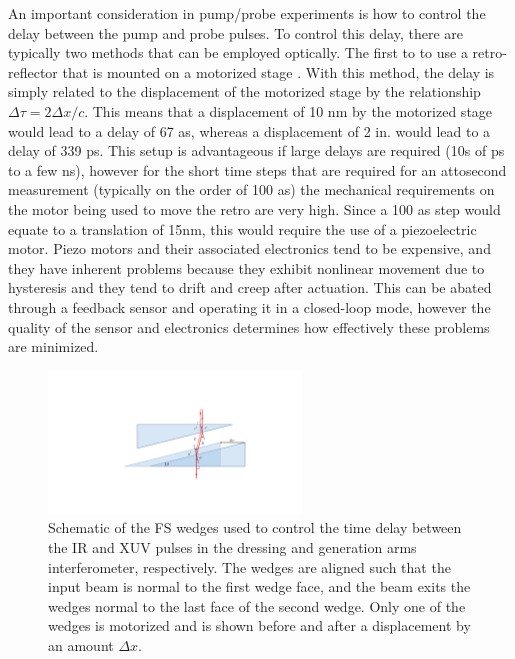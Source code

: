 An important consideration in pump/probe experiments is how to control the delay between the pump and probe pulses.  To control this delay, there are typically two methods that can be employed optically.  The first to to use a retro-reflector that is mounted on a motorized stage \cite{jagerAttosecondTransientAbsorption2018, jagerAttosecondTransientAbsorption2017, bellTransientAbsorptionSpectroscopy2013, jiangChargeCarrierDynamics2015, borjaElectronDynamicsSolids2016, chengAttoseondTransientAbsorption2015}.  With this method, the delay is simply related to the displacement of the motorized stage by the relationship $\Delta\tau = 2\Delta x/c$.  This means that a displacement of 10 nm by the motorized stage would lead to a delay of 67 as, whereas a displacement of 2 in. would lead to a delay of 339 ps. This setup is advantageous if large delays are required (10s of ps to a few ns), however for the short time steps that are required for an attosecond measurement (typically on the order of 100 as) the mechanical requirements on the motor being used to move the retro are very high.  Since a 100 as step would equate to a translation of 15nm, this would require the use of a piezoelectric motor.  Piezo motors and their associated electronics tend to be expensive, and they have inherent problems because they exhibit nonlinear movement due to hysteresis and they tend to drift and creep after actuation.  This can be abated through a feedback sensor and operating it in a closed-loop mode, however the quality of the sensor and electronics determines how effectively these problems are minimized.

\begin{figure}
	\centering
	\includegraphics[width=0.6\textwidth]{figures/Beamline/wedge_delay_calibration.pdf}
	\caption[Schematic of FS wedges used for delay control]{Schematic of the FS wedges used to control the time delay between the IR and XUV pulses in the dressing and generation arms interferometer, respectively. The wedges are aligned such that the input beam is normal to the first wedge face, and the beam exits the wedges normal to the last face of the second wedge.  Only one of the wedges is motorized and is shown before and after a displacement by an amount $\Delta x$.}
	\label{fig:wedges}
\end{figure}

